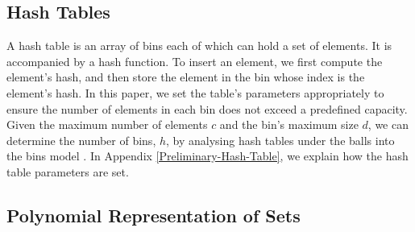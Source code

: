 
\vspace{-2mm}



\vspace{-1mm}

\subsection{Hash Tables}
\vspace{-.5mm}

A hash table is an array of   bins each of which can hold a set of elements. It is accompanied by a hash function. To insert an element, we first compute the element's hash,  and then store the element in the bin whose index is the element's hash. In this paper, we set the table's parameters appropriately to ensure the number of elements in each bin does not exceed a predefined capacity. Given the maximum number of elements $c$ and the bin's maximum size $d$, we can determine the number of bins, $h$, by analysing hash tables under the balls into the bins model  \cite{DBLP:conf/stoc/BerenbrinkCSV00}. In Appendix \ref{Preliminary-Hash-Table}, we explain how the hash table parameters are set.




\vspace{-3mm}



\vspace{-3mm}

\subsection{Polynomial Representation of Sets}\label{sec::poly-rep}
\vspace{-1mm}

